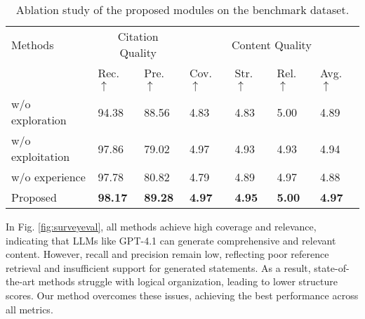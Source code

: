 \documentclass[manuscript,review,anonymous]{acmart}
\begin{document}
\begin{table}[h]
    \centering
    \begin{adjustbox}{width=\columnwidth}
        \begin{tabular}{lllllll}
            \toprule
            \multirow{2.5}{*}{Methods} & \multicolumn{2}{c}{Citation Quality} & \multicolumn{4}{c}{Content Quality} \\
            \cmidrule(lr){2-3} \cmidrule(lr){4-7}
            & Rec. $\uparrow$ & Pre. $\uparrow$ & Cov. $\uparrow$ & Str. $\uparrow$ & Rel. $\uparrow$ & Avg. $\uparrow$ \\
            \midrule
            w/o exploration  & 94.38 & 88.56 & 4.83 & 4.83 & 5.00 & 4.89 \\
            w/o exploitation & 97.86 & 79.02 & 4.97 & 4.93 & 4.93 & 4.94 \\
            w/o experience        & 97.78 & 80.82 & 4.79 & 4.89 & 4.97 & 4.88 \\
            \cellcolor{gray!15}Proposed & \cellcolor{gray!15}\textbf{98.17} & \cellcolor{gray!15}\textbf{89.28} & \cellcolor{gray!15}\textbf{4.97} & \cellcolor{gray!15}\textbf{4.95} & \cellcolor{gray!15}\textbf{5.00} & \cellcolor{gray!15}\textbf{4.97} \\
            \bottomrule
        \end{tabular}
    \end{adjustbox}
    \caption{Ablation study of the proposed modules on the benchmark dataset.}
    \label{tab:ablation_study}
\end{table}

In Fig. \ref{fig:surveyeval}, all methods achieve high coverage and relevance, indicating that LLMs like GPT-4.1 can generate comprehensive and relevant content. However, recall and precision remain low, reflecting poor reference retrieval and insufficient support for generated statements. As a result, state-of-the-art methods struggle with logical organization, leading to lower structure scores. Our method overcomes these issues, achieving the best performance across all metrics.
\end{document}
